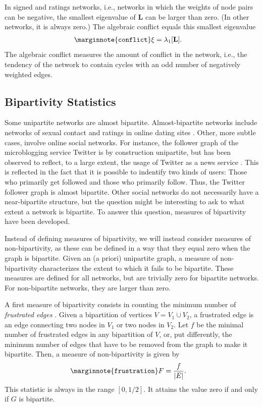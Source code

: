 \documentclass{article}
\begin{document}
In signed and ratings networks, i.e., networks in which the weights of
node pairs can be negative, the smallest eigenvalue of $\mathbf L$ can
be larger than zero.  (In other networks, it is always zero.) The
algebraic conflict equals this smallest eigenvalue
\begin{align}
  \marginnote{\texttt{conflict}} \xi &= \lambda_1[\mathbf L].
\end{align}
The algebraic conflict measures the amount of conflict in the network,
i.e., the tendency of the network to contain cycles with an odd number
of negatively weighted edges.

\subsection{Bipartivity Statistics}
Some unipartite networks are almost bipartite.  Almost-bipartite
networks include networks of sexual contact \citep{b719} and ratings in
online dating sites \citep{b311,kunegis:split-complex-dating}.  Other,
more subtle cases, involve online social networks.  For instance, the
follower graph of the microblogging service Twitter is by construction
unipartite, but has been observed to reflect, to a large extent, the
usage of Twitter as a news service \citep{b545}. This is reflected in the
fact that it is possible to indentify two kinds of users: Those who
primarily get followed and those who primarily follow.  Thus, the
Twitter follower graph is almost bipartite.  Other social networks do
not necessarily have a near-bipartite structure, but the question might
be interesting to ask to what extent a network is bipartite.  To answer
this question, measures of bipartivity have been developed.

Instead of defining measures of bipartivity, we will instead consider
measures of non-bipartivity, as these can be defined in a way that they
equal zero when the graph is bipartite.  Given an (a priori) unipartite
graph, a measure of non-bipartivity characterizes the extent to which it
fails to be bipartite.  These measures are defined for all networks, but
are trivially zero for bipartite networks.  For non-bipartite networks,
they are larger than zero.

A first measure of bipartivity consists in counting the minimum number
of \emph{frustrated edges} \citep{b531}. Given a bipartition of vertices
$V=V_1\cup V_2$, a frustrated edge is an edge connecting two nodes in
$V_1$ or two nodes in $V_2$.  Let $f$ be the minimal number of
frustrated edges in any bipartition of $V$, or, put differently, the
minimum number of edges that have to be removed from the graph to make
it bipartite.  Then, a measure of non-bipartivity is given by
\begin{align}
  \marginnote{\texttt{frustration}} F &= \frac f {|E|}.
\end{align}
This statistic is always in the range $[0, 1/2]$.  It attains the value
zero if and only if $G$ is bipartite.
\end{document}
